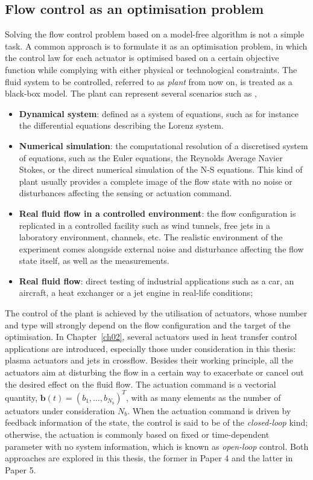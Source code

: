 \subsection{Flow control as an optimisation problem}\label{ss:optproblem}
Solving the flow control problem based on a model-free algorithm is not a simple task. A common approach is to formulate it as an optimisation problem, in which the control law for each actuator is optimised based on a certain objective function while complying with either physical or technological constraints. The fluid system to be controlled, referred to as \textit{plant} from now on, is treated as a black-box model. The plant can represent several scenarios such as \citep{cornejomacedaPhD},
%
\begin{itemize}
    \item \textbf{Dynamical system}: defined as a system of equations, such as for instance the differential equations describing the Lorenz system.
    \item \textbf{Numerical simulation}: the computational resolution of a discretised system of equations, such as the Euler equations, the Reynolds Average Navier Stokes, or the direct numerical simulation of the N-S equations. This kind of plant usually provides a complete image of the flow state with no noise or disturbances affecting the sensing or actuation command.
    \item \textbf{Real fluid flow in a controlled environment}: the flow configuration is replicated in a controlled facility such as wind tunnels, free jets in a laboratory environment, channels, etc. The realistic environment of the experiment comes alongside external noise and disturbance affecting the flow state itself, as well as the measurements.
    \item \textbf{Real fluid flow}: direct testing of industrial applications such as a car, an aircraft, a heat exchanger or a jet engine in real-life conditions;
\end{itemize}
%
The control of the plant is achieved by the utilisation of actuators, whose number and type will strongly depend on the flow configuration and the target of the optimisation. In Chapter~\ref{ch02}, several actuators used in heat transfer control applications are introduced, especially those under consideration in this thesis: plasma actuators and jets in crossflow. Besides their working principle, all the actuators aim at disturbing the flow in a certain way to exacerbate or cancel out the desired effect on the fluid flow. The actuation command is a vectorial quantity, $\bm{b}(t) = (b_1, \ldots ,b_{N_b})^T$, with as many elements as the number of actuators under consideration $N_b$. When the actuation command is driven by feedback information of the state, the control is said to be of the \textit{closed-loop} kind; otherwise, the actuation is commonly based on fixed or time-dependent parameter with no system information, which is known as \textit{open-loop} control. Both approaches are explored in this thesis, the former in Paper 4 and the latter in Paper 5. 

